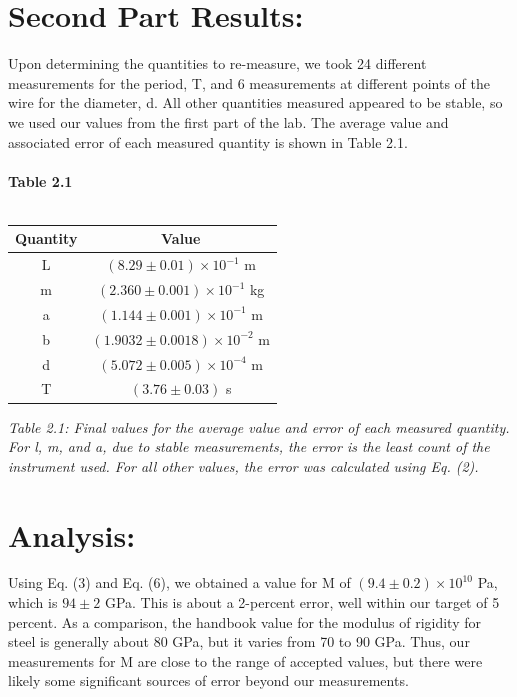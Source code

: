 \documentclass[leqno]{article}
\begin{document}
\section*{Second Part Results:}
Upon determining the quantities to re-measure, we took 24 different measurements for the period, T, and 6 measurements at different points of the wire for the diameter, d.  All other quantities measured appeared to be stable, so we used our values from the first part of the lab.  The average value  and associated error of each measured quantity is shown in Table 2.1.\\\\
\textbf{Table 2.1}\\\\
\begin{tabular}{c|c}
	Quantity & Value\\
	\hline
	L & $(8.29\pm0.01)\times 10^{-1}$ m\\
	m & $(2.360\pm0.001)\times 10^{-1}$ kg\\
	a & $(1.144\pm0.001)\times 10^{-1}$ m\\
	b & $(1.9032\pm0.0018)\times10^{-2}$ m\\
	d & $(5.072\pm0.005)\times 10^{-4}$ m\\
	T & $(3.76\pm0.03)$ s\\
\end{tabular}
\begin{flushleft}
\textit{\small Table 2.1: Final values for the average value and error of each measured quantity.  For l, m, and a, due to stable measurements, the error is the least count of the instrument used.  For all other values, the error was calculated using Eq. (2).}
\end{flushleft}
\section*{Analysis:}
Using Eq. (3) and Eq. (6), we obtained a value for M of $(9.4\pm0.2)\times10^{10}$ Pa, which is $94\pm2$ GPa.  This is about a 2-percent error, well within our target of 5 percent.  As a comparison, the handbook value for the modulus of rigidity for steel is generally about 80 GPa, but it varies from 70 to 90 GPa.  Thus, our measurements for M are close to the range of accepted values, but there were likely some significant sources of error beyond our measurements.
\end{document}
